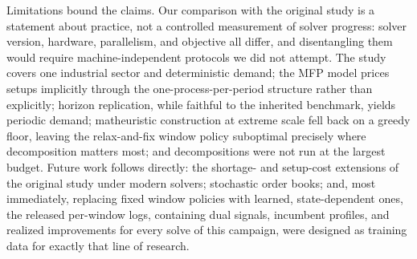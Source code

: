 Limitations bound the claims. Our comparison with the original
study is a statement about practice, not a controlled measurement of
solver progress: solver version, hardware, parallelism, and objective
all differ, and disentangling them would require machine-independent
protocols we did not attempt. The study covers one industrial sector
and deterministic demand; the MFP model prices setups
implicitly through the one-process-per-period structure rather than
explicitly; horizon replication, while faithful to the inherited
benchmark, yields periodic demand; matheuristic construction at
extreme scale fell back on a greedy floor, leaving the
relax-and-fix window policy suboptimal precisely where
decomposition matters most; and decompositions were not run at the
largest budget. Future work follows directly: the shortage- and
setup-cost extensions of the original study under modern solvers;
stochastic order books; and, most immediately, replacing fixed
window policies with learned, state-dependent ones, the released
per-window logs, containing dual signals, incumbent profiles, and
realized improvements for every solve of this campaign, were
designed as training data for exactly that line of research.
